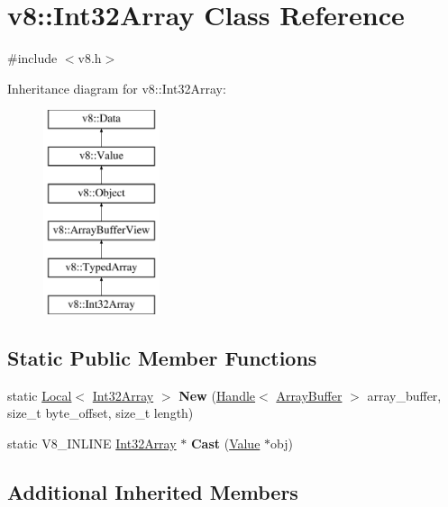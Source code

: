 \hypertarget{classv8_1_1Int32Array}{\section{v8\-:\-:Int32\-Array Class Reference}
\label{classv8_1_1Int32Array}
}


{\ttfamily \#include $<$v8.\-h$>$}

Inheritance diagram for v8\-:\-:Int32\-Array\-:\begin{figure}[H]
\begin{center}
\leavevmode
\includegraphics[height=6.000000cm]{classv8_1_1Int32Array}
\end{center}
\end{figure}
\subsection*{Static Public Member Functions}
\begin{DoxyCompactItemize}
\item 
\hypertarget{classv8_1_1Int32Array_a41fa255626b8e00e9cc9f5d4e0c518d5}{static \hyperlink{classv8_1_1Local}{Local}$<$ \hyperlink{classv8_1_1Int32Array}{Int32\-Array} $>$ {\bfseries New} (\hyperlink{classv8_1_1Handle}{Handle}$<$ \hyperlink{classv8_1_1ArrayBuffer}{Array\-Buffer} $>$ array\-\_\-buffer, size\-\_\-t byte\-\_\-offset, size\-\_\-t length)}\label{classv8_1_1Int32Array_a41fa255626b8e00e9cc9f5d4e0c518d5}

\item 
\hypertarget{classv8_1_1Int32Array_afe7cdf534deadc3d872d8a43778809f1}{static V8\-\_\-\-I\-N\-L\-I\-N\-E \hyperlink{classv8_1_1Int32Array}{Int32\-Array} $\ast$ {\bfseries Cast} (\hyperlink{classv8_1_1Value}{Value} $\ast$obj)}\label{classv8_1_1Int32Array_afe7cdf534deadc3d872d8a43778809f1}

\end{DoxyCompactItemize}
\subsection*{Additional Inherited Members}


